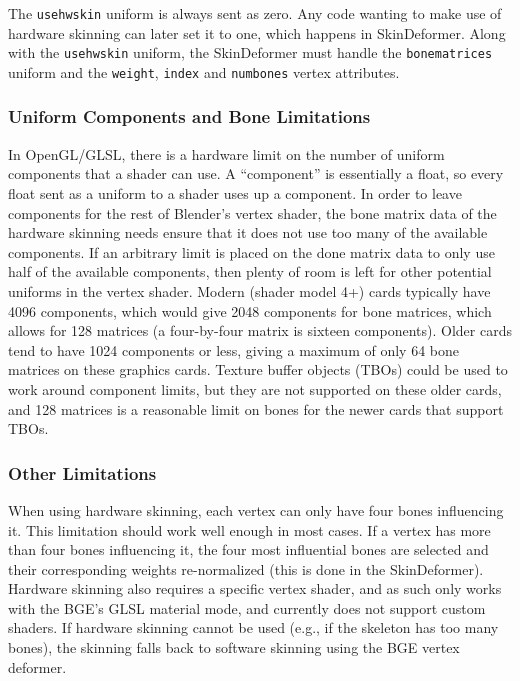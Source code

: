 The \texttt{usehwskin} uniform is always sent as zero.
Any code wanting to make use of hardware skinning can later set it to one, which happens in SkinDeformer.
Along with the \texttt{usehwskin} uniform, the SkinDeformer must handle the \texttt{bonematrices} uniform and the \texttt{weight}, \texttt{index} and \texttt{numbones} vertex attributes.


\subsubsection{Uniform Components and Bone Limitations}

In OpenGL/GLSL, there is a hardware limit on the number of uniform components that a shader can use.
A ``component'' is essentially a float, so every float sent as a uniform to a shader uses up a component.
In order to leave components for the rest of Blender's vertex shader, the bone matrix data of the hardware skinning needs ensure that it does not use too many of the available components.
If an arbitrary limit is placed on the done matrix data to only use half of the available components, then plenty of room is left for other potential uniforms in the vertex shader.
Modern (shader model 4+) cards typically have 4096 components, which would give 2048 components for bone matrices, which allows for 128 matrices (a four-by-four matrix is sixteen components).
Older cards tend to have 1024 components or less, giving a maximum of only 64 bone matrices on these graphics cards.
Texture buffer objects (TBOs) could be used to work around component limits\cite{ARB_texture_buffer_object}, but they are not supported on these older cards, and 128 matrices is a reasonable limit on bones for the newer cards that support TBOs.

\subsubsection{Other Limitations}

When using hardware skinning, each vertex can only have four bones influencing it.
This limitation should work well enough in most cases.
If a vertex has more than four bones influencing it, the four most influential bones are selected and their corresponding weights re-normalized (this is done in the SkinDeformer).
Hardware skinning also requires a specific vertex shader, and as such only works with the BGE's GLSL material mode, and currently does not support custom shaders.
If hardware skinning cannot be used (e.g., if the skeleton has too many bones), the skinning falls back to software skinning using the BGE vertex deformer.

